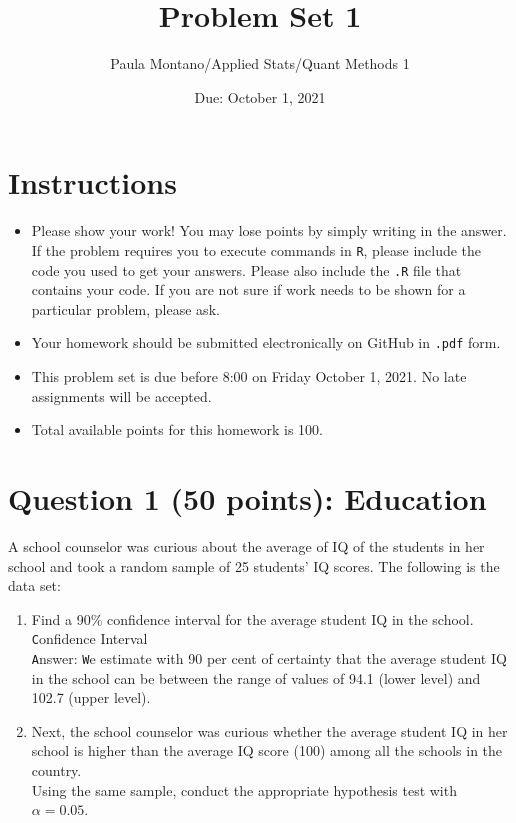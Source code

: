 \documentclass[12pt,letterpaper]{article}
\title{Problem Set 1}
\date{Due: October 1, 2021}
\author{Paula Montano/Applied Stats/Quant Methods 1}
\begin{document}
	\maketitle
	
	\section*{Instructions}
	\begin{itemize}
		\item Please show your work! You may lose points by simply writing in the answer. If the problem requires you to execute commands in \texttt{R}, please include the code you used to get your answers. Please also include the \texttt{.R} file that contains your code. If you are not sure if work needs to be shown for a particular problem, please ask.
		\item Your homework should be submitted electronically on GitHub in \texttt{.pdf} form.
		\item This problem set is due before 8:00 on Friday October 1, 2021. No late assignments will be accepted.
		\item Total available points for this homework is 100.
	\end{itemize}
	
	\vspace{1cm}
	\section*{Question 1 (50 points): Education}

A school counselor was curious about the average of IQ of the students in her school and took a random sample of 25 students' IQ scores. The following is the data set:\\
\vspace{.5cm}

  

\vspace{1cm}

\begin{enumerate}
	\item Find a 90\% confidence interval for the average student IQ in the school.\\

	\texttt Confidence Interval\\	
	 
	
	\texttt Answer: 
	\texttt We estimate with 90 per cent of certainty that the average student IQ in the school can be between the range of values of 94.1 (lower level) and 102.7 (upper level).\\

	
	\item Next, the school counselor was curious  whether  the average student IQ in her school is higher than the average IQ score (100) among all the schools in the country.\\ 
	
	\noindent Using the same sample, conduct the appropriate hypothesis test with $\alpha=0.05$.
\end{enumerate}
\end{document}
